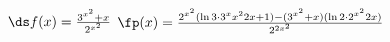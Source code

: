 {$\ds f(x) = \frac{3^{x^2}+x}{2^{x^2}}$
}
{$\fp(x) = \frac{2^{x^2}(\ln 3\cdot 3^x{x^2}2x+1) - (3^{x^2}+x)(\ln 2\cdot 2^{x^2}2x)}{2^{2x^2}}$
}
